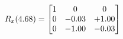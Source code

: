 \documentclass[preview]{standalone}
\begin{document}
\begin{align*}
\special{dvisvgm:raw <g id='unique000'>}R_{x}(4.68) = \begin{bmatrix}1 & 0 & 0 \\0 & -0.03 & +1.00 \\0 & -1.00 & -0.03\end{bmatrix}\special{dvisvgm:raw </g>}
\end{align*}
\end{document}

